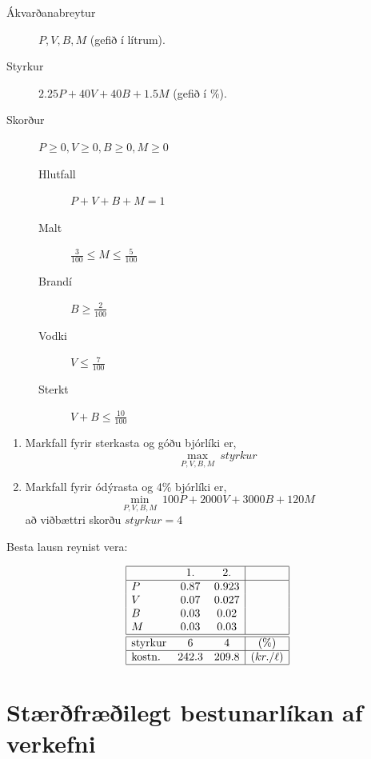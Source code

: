 \begin{lausn}
\begin{description}
  \item[Ákvarðanabreytur] $ P, V, B, M $ \quad (gefið í lítrum).
  \item[Styrkur] $2.25P+40V+40B+1.5M$ \quad (gefið í \%).
  \item[Skorður] $P\geq0,V\geq0,B\geq0,M\geq0$
  \begin{description}
  \item[Hlutfall]  $P+V+B+M=1$ 
  \item[Malt]	$\frac{3}{100}\leq M \leq \frac{5}{100}$
  \item[Brandí] $B\geq\frac{2}{100} $
  \item[Vodki] $V\leq\frac{7}{100}$
  \item[Sterkt] $V+B\leq\frac{10}{100}$
  \end{description}
\end{description}
\begin{enumerate}
  \item Markfall fyrir sterkasta og góðu bjórlíki er, $$\max_{P,V,B,M}~styrkur$$
  \item Markfall fyrir ódýrasta og 4\% bjórlíki er, $$\min_{P,V,B,M}~100P+2000V+3000B+120M$$ að viðbættri skorðu $styrkur=4$
\end{enumerate}

Besta lausn reynist vera:
\begin{center}
  \[\begin{array}{|lcc|c|}\hline & 1. & 2. &\\ \hline 
      P & 0.87 & 0.923 & \\
      V & 0.07 & 0.027 &\\
      B & 0.03 & 0.02 &\\
      M & 0.03 & 0.03 &\\ \hline \hline
    \mbox{styrkur}  & 6 & 4 & (\%)\\ \hline
    \mbox{kostn.} & 242.3 & 209.8 & (kr./\ell)\\ \hline
    \end{array}\]

\end{center}



\end{lausn}

\newpage 
\section{Stærðfræðilegt bestunarlíkan af verkefni}
